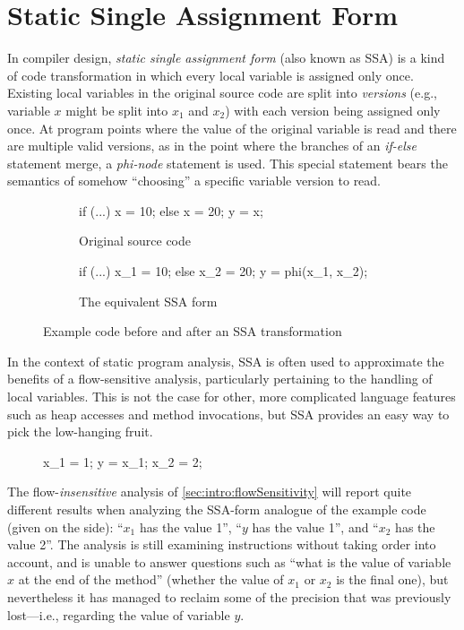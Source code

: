 \section{Static Single Assignment Form}

In compiler design, \emph{static single assignment form} (also known as SSA) is a kind of code transformation in which every local variable is assigned only once. Existing local variables in the original source code are split into \emph{versions} (e.g., variable $x$ might be split into $x_1$ and $x_2$) with each version being assigned only once. At program points where the value of the original variable is read and there are multiple valid versions, as in the point where the branches of an \emph{if-else} statement merge, a \emph{phi-node} statement is used. This special statement bears the semantics of somehow ``choosing'' a specific variable version to read.

\begin{figure}[h]
\begin{subfigure}{.45\textwidth}
\begin{javacode}
if (...) x = 10;
else x = 20;
y = x;
\end{javacode}
\caption{Original source code}
\end{subfigure}%
\hfill
\begin{subfigure}{.45\textwidth}
\begin{javacode}
if (...) x_1 = 10;
else x_2 = 20;
y = phi(x_1, x_2);
\end{javacode}
\caption{The equivalent SSA form}
\end{subfigure}
\caption{Example code before and after an SSA transformation}
\end{figure}

In the context of static program analysis, SSA is often used to approximate the
benefits of a flow-sensitive analysis, particularly pertaining to the handling
of local variables. This is not the case for other, more complicated language
features such as heap accesses and method invocations, but SSA provides an easy
way to pick the low-hanging fruit.

\setlength\intextsep{15pt}
\begin{figure}
\centering
\begin{javacodeNoLines}
x_1 = 1;
y = x_1;
x_2 = 2;
\end{javacodeNoLines}
\end{figure}

The flow-\emph{insensitive} analysis of \ref{sec:intro:flowSensitivity} will report quite different results when analyzing the SSA-form analogue of the example code (given on the side): ``$x_1$ has the value 1'', ``$y$ has the value 1'', and ``$x_2$ has the value 2''. The analysis is still examining instructions without taking order into account, and is unable to answer questions such as ``what is the value of variable $x$ at the end of the method'' (whether the value of $x_1$ or $x_2$ is the final one), but nevertheless it has managed to reclaim some of the precision that was previously lost---i.e., regarding the value of variable $y$.



